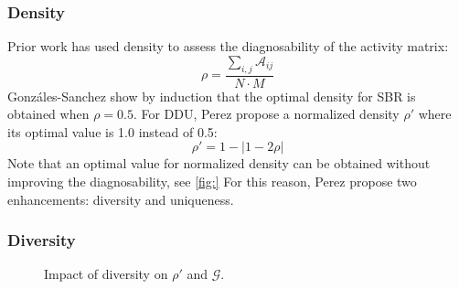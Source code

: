 \documentclass[twoside,a4paper,11pt]{memoir}
\begin{document}
\subsubsection{Density}
Prior work \cite{} has used density to assess the diagnosability of the activity matrix:
\begin{equation}
  \rho = \frac{\sum_{i,j}\mathcal{A}_{ij}}{N \cdot M}
\end{equation}
Gonzáles-Sanchez \etal \cite{} show by induction that the optimal density for SBR is obtained when $\rho = 0.5$.
For DDU, Perez \etal propose a normalized density $\rho'$ where its optimal value is 1.0 instead of 0.5:
\begin{equation}
  \rho' = 1 - | 1 - 2 \rho |
\end{equation}
Note that an optimal value for normalized density can be obtained without improving the diagnosability, see \autoref{fig:}
For this reason, Perez \etal \cite{DBLP:conf/icse/PerezAD17} propose two enhancements: diversity and uniqueness.

\subsubsection{Diversity}
\begin{figure}
\begin{center}
\qquad%
\end{center}
\vspace{-0.3cm}
\caption{Impact of diversity on $\rho'$ and $\mathcal{G}$.}\label{fig:diversity_spectra}
\end{figure}
\end{document}
